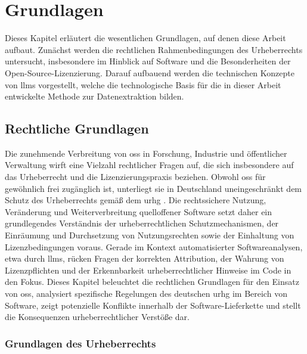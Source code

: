 \chapter{Grundlagen}\label{ch:grundlagen}

Dieses Kapitel erläutert die wesentlichen Grundlagen, auf denen diese Arbeit aufbaut.
Zunächst werden die rechtlichen Rahmenbedingungen des Urheberrechts untersucht, insbesondere im Hinblick auf Software und die Besonderheiten der Open-Source-Lizenzierung.
Darauf aufbauend werden die technischen Konzepte von \glspl{llm} vorgestellt, welche die technologische Basis für die in dieser Arbeit entwickelte Methode zur Datenextraktion bilden.


\section{Rechtliche Grundlagen}\label{sec:rechtliches}

Die zunehmende Verbreitung von \gls{oss} in Forschung, Industrie und öffentlicher Verwaltung wirft eine Vielzahl rechtlicher Fragen auf, die sich insbesondere auf das Urheberrecht und die Lizenzierungspraxis beziehen.
Obwohl \gls{oss} für gewöhnlich frei zugänglich ist, unterliegt sie in Deutschland uneingeschränkt dem Schutz des Urheberrechts gemäß dem \gls{urhg} \autocite{noauthor_urhg_nodate}.
Die rechtssichere Nutzung, Veränderung und Weiterverbreitung quelloffener Software setzt daher ein grundlegendes Verständnis der urheberrechtlichen Schutzmechanismen, der Einräumung und Durchsetzung von Nutzungsrechten sowie der Einhaltung von Lizenzbedingungen voraus.
Gerade im Kontext automatisierter Softwareanalysen, etwa durch \glspl{llm}, rücken Fragen der korrekten Attribution, der Wahrung von Lizenzpflichten und der Erkennbarkeit urheberrechtlicher Hinweise im Code in den Fokus.
Dieses Kapitel beleuchtet die rechtlichen Grundlagen für den Einsatz von \gls{oss}, analysiert spezifische Regelungen des deutschen \gls{urhg} im Bereich von Software, zeigt potenzielle Konflikte innerhalb der Software-Lieferkette und stellt die Konsequenzen urheberrechtlicher Verstöße dar.


\subsection{Grundlagen des Urheberrechts}\label{subsec:grundlagen-des-urheberrechts}

